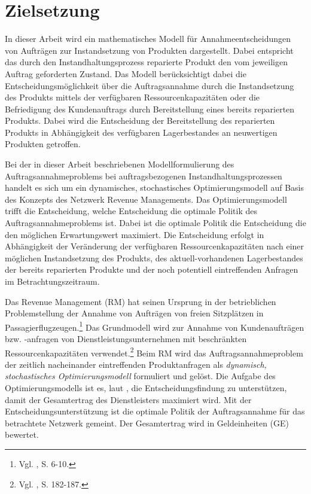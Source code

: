 \section{Zielsetzung}

In dieser Arbeit wird ein mathematisches Modell für Annahmeentscheidungen von Aufträgen zur Instandsetzung von Produkten dargestellt. Dabei entspricht das durch den Instandhaltungsprozess reparierte Produkt den vom jeweiligen Auftrag geforderten Zustand. Das Modell berücksichtigt dabei die Entscheidungsmöglichkeit über die Auftragsannahme durch die Instandsetzung des Produkts mittels der verfügbaren Ressourcenkapazitäten oder die Befriedigung des Kundenauftrags durch Bereitstellung eines bereits reparierten Produkts. Dabei wird die Entscheidung der Bereitstellung des reparierten Produkts in Abhängigkeit des verfügbaren Lagerbestandes an neuwertigen Produkten getroffen.

Bei der in dieser Arbeit beschriebenen Modellformulierung des Auftragsannahmeproblems bei auftragsbezogenen Instandhaltungsprozessen handelt es sich um ein dynamisches, stochastisches Optimierungsmodell auf Basis des Konzepts des Netzwerk Revenue Managements. Das Optimierungsmodell trifft die Entscheidung, welche Entscheidung die optimale Politik des Auftragsannahmeproblems ist. Dabei ist die optimale Politik die Entscheidung die den möglichen Erwartungswert maximiert. Die Entscheidung erfolgt in Abhängigkeit der Veränderung der verfügbaren Ressourcenkapazitäten nach einer möglichen Instandsetzung des Produkts, des aktuell-vorhandenen Lagerbestandes der bereits reparierten Produkte und der noch potentiell eintreffenden Anfragen im Betrachtungszeitraum.

Das Revenue Management (RM) hat seinen Ursprung in der betrieblichen Problemstellung der Annahme von Aufträgen von freien Sitzplätzen in Passagierflugzeugen.\footnote{Vgl. \cite{talluri2004theory}, S. 6-10.} Das Grundmodell wird zur Annahme von Kundenaufträgen bzw. -anfragen von Dienstleistungsunternehmen mit beschränkten Ressourcenkapazitäten verwendet.\footnote{Vgl. \cite{Petrick:2009aa}, S. 182-187.} %
Beim RM wird das Auftragsannahmeproblem der zeitlich nacheinander eintreffenden Produktanfragen als \textit{dynamisch, stochastisches Optimierungsmodell} formuliert und gelöst.
Die Aufgabe des Optimierungsmodells ist es, laut \cite{talluri2004theory}, die Entscheidungsfindung zu unterstützen, damit der Gesamtertrag des Dienstleisters maximiert wird. Mit der Entscheidungsunterstützung ist die optimale Politik der Auftragsannahme für das betrachtete Netzwerk gemeint. Der Gesamtertrag wird in Geldeinheiten (GE) bewertet. 


